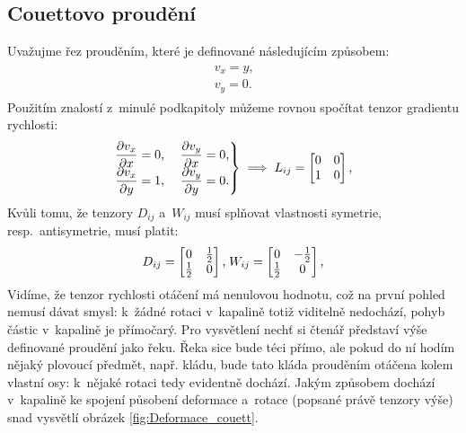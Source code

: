 \documentclass[12pt]{article}
\begin{document}
\subsection{Couettovo proudění}%

\label{sec:Couettovo_proudění}
Uvažujme řez prouděním, které je definované následujícím způsobem:
\begin{align}
    \begin{split}
        v_x = y\text{,}\\
        v_y = 0\text{.}
    \end{split}
\end{align}
Použitím znalostí z~minulé podkapitoly můžeme rovnou spočítat tenzor gradientu rychlosti:
\begin{equation}
    \begin{rcases}
        \begin{matrix}
            \dfrac{\partial v_x}{\partial x} = 0\text{,}& \;
            \dfrac{\partial v_y}{\partial x} = 0 \text{,}\\
            \dfrac{\partial v_x}{\partial y} = 1\text{,}& \;
            \dfrac{\partial v_y}{\partial y} = 0 \text{.}
        \end{matrix}
    \end{rcases}
    \;\Longrightarrow\;
    L_{ij} = 
    \begin{bmatrix}
        0 & 0 \\
        1 & 0
    \end{bmatrix}\text{,}\\
\end{equation}
Kvůli tomu, že tenzory $D_{ij}$ a~$W_{ij}$ musí splňovat vlastnosti symetrie, resp.~antisymetrie, musí platit:
\begin{equation}
    D_{ij} = 
    \begin{bmatrix}
        0 & \frac{1}{2} \\
        \frac{1}{2} & 0
    \end{bmatrix}\text{,}\\
    \;W_{ij} = 
    \begin{bmatrix}
        0 & -\frac{1}{2} \\
        \frac{1}{2} & 0
    \end{bmatrix}\text{,}\\
\end{equation}
Vidíme, že tenzor rychlosti otáčení má nenulovou hodnotu, což na první pohled nemusí dávat smysl: k~žádné rotaci v~kapalině totiž viditelně nedochází, pohyb částic v~kapalině je přímočarý. Pro vysvětlení nechť si čtenář představí výše definované proudění jako řeku. Řeka sice bude téci přímo, ale pokud do ní hodím nějaký plovoucí předmět, např. kládu, bude tato kláda prouděním otáčena kolem vlastní osy: k~nějaké rotaci tedy evidentně dochází. Jakým způsobem dochází v~kapalině ke spojení působení deformace a~rotace (popsané právě tenzory výše) snad vysvětlí obrázek \ref{fig:Deformace_couett}.
\end{document}
